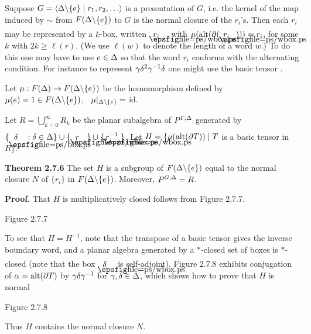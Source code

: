 Suppose $G=\<\D\backslash\{e\}\mid
r_1,r_2,\dots\>$ is a presentation of $G$, i.e. the kernel of
the map induced by
$\sim$ from $F(\Delta\backslash\{e\})$ to $G$ is the normal closure of
the
$r_i$'s. Then each $r_i$ may be represented by a $k$-box, written
$\blankbox{r_i}$, with $\mu({\op{alt}}(\p(\blankbox{r_i})))=r_i$,
for some $k$ with $2k\geq\ell(r)$. (We use $\ell(w)$ to denote the
length of a word $w$.) To do this one may have to use $e\in\Delta$ so
that the word $r_i$ conforms with the alternating condition. For
instance to represent $\gamma\delta^2\gamma^{-1}\delta$ one might use the basic
tensor 
.      

Let $\mu:F(\Delta)\to F(\Delta\backslash\{e\})$ be the homomorphism defined
by $\mu(e)=1\in F(\Delta\backslash\{e\})$, \ $\mu|_{\Delta\backslash\{e\}}=$
id.

 Let $R=\bigcup^{\infty}_{k=0} R_k$
be the planar subalgebra of $P^{\Gamma,\Delta}$ generated by
$\{ \boxf{\d}  :\d\in\D\}\cup \{ \blankbox{r}\}
\cup \{\blankbox{\hskip2pt r^{-1}_i}\}$.
Let $H=\{\mu({\bf\rm{alt}}(\partial T))\mid T$ is a basic tensor in $R\}$.

{\bf Theorem 2.7.6} The set $H$ is a subgroup of
$F(\Delta\backslash\{e\})$ equal to the normal closure $N$ of $\{r_i\}$
in $F(\Delta\backslash\{e\})$. Moreover, $P^{G,\Delta}=R$.

\medskip
{\bf Proof}. That $H$ is multiplicatively closed follows from
Figure 2.7.7.
\[
        
\]
\begin{center}
Figure 2.7.7
\end{center}
\noindent To see that $H=H^{-1}$, note that the transpose of a
basic tensor gives the inverse boundary word, and a planar algebra
generated by a $*$-closed set of boxes is $*$-closed (note that the
box $\blankbox{\d}$ is self-adjoint). Figure 2.7.8 exhibits
conjugation of $\alpha={\bf\rm{alt}}(\partial T)$ by $\gamma\delta\gamma^{-1}$ for
$\gamma,\delta\in\Delta$, which shows how to prove that $H$ is normal
\[
        
\]
\begin{center}
Figure 2.7.8
\end{center}
\noindent Thus $H$ contains the normal closure $N$.

